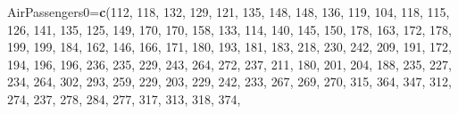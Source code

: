 \documentclass[
]{book}
\newenvironment{Shaded}{\begin{snugshade}}{\end{snugshade}}
\newcommand{\DecValTok}[1]{\textcolor[rgb]{0.00,0.00,0.81}{#1}}
\newcommand{\FunctionTok}[1]{\textcolor[rgb]{0.13,0.29,0.53}{\textbf{#1}}}
\newcommand{\NormalTok}[1]{#1}
\newcommand{\OtherTok}[1]{\textcolor[rgb]{0.56,0.35,0.01}{#1}}
\begin{document}
\begin{Shaded}
\begin{Highlighting}[]
\NormalTok{AirPassengers0}\OtherTok{=}\FunctionTok{c}\NormalTok{(}\DecValTok{112}\NormalTok{, }\DecValTok{118}\NormalTok{, }\DecValTok{132}\NormalTok{, }\DecValTok{129}\NormalTok{, }\DecValTok{121}\NormalTok{, }\DecValTok{135}\NormalTok{, }\DecValTok{148}\NormalTok{, }\DecValTok{148}\NormalTok{, }\DecValTok{136}\NormalTok{, }\DecValTok{119}\NormalTok{, }\DecValTok{104}\NormalTok{, }\DecValTok{118}\NormalTok{, }\DecValTok{115}\NormalTok{, }\DecValTok{126}\NormalTok{, }\DecValTok{141}\NormalTok{, }
                \DecValTok{135}\NormalTok{, }\DecValTok{125}\NormalTok{, }\DecValTok{149}\NormalTok{, }\DecValTok{170}\NormalTok{, }\DecValTok{170}\NormalTok{, }\DecValTok{158}\NormalTok{, }\DecValTok{133}\NormalTok{, }\DecValTok{114}\NormalTok{, }\DecValTok{140}\NormalTok{, }\DecValTok{145}\NormalTok{, }\DecValTok{150}\NormalTok{, }\DecValTok{178}\NormalTok{, }\DecValTok{163}\NormalTok{, }\DecValTok{172}\NormalTok{, }\DecValTok{178}\NormalTok{, }
                \DecValTok{199}\NormalTok{, }\DecValTok{199}\NormalTok{, }\DecValTok{184}\NormalTok{, }\DecValTok{162}\NormalTok{, }\DecValTok{146}\NormalTok{, }\DecValTok{166}\NormalTok{, }\DecValTok{171}\NormalTok{, }\DecValTok{180}\NormalTok{, }\DecValTok{193}\NormalTok{, }\DecValTok{181}\NormalTok{, }\DecValTok{183}\NormalTok{, }\DecValTok{218}\NormalTok{, }\DecValTok{230}\NormalTok{, }\DecValTok{242}\NormalTok{, }\DecValTok{209}\NormalTok{, }
                \DecValTok{191}\NormalTok{, }\DecValTok{172}\NormalTok{, }\DecValTok{194}\NormalTok{, }\DecValTok{196}\NormalTok{, }\DecValTok{196}\NormalTok{, }\DecValTok{236}\NormalTok{, }\DecValTok{235}\NormalTok{, }\DecValTok{229}\NormalTok{, }\DecValTok{243}\NormalTok{, }\DecValTok{264}\NormalTok{, }\DecValTok{272}\NormalTok{, }\DecValTok{237}\NormalTok{, }\DecValTok{211}\NormalTok{, }\DecValTok{180}\NormalTok{, }\DecValTok{201}\NormalTok{, }
                \DecValTok{204}\NormalTok{, }\DecValTok{188}\NormalTok{, }\DecValTok{235}\NormalTok{, }\DecValTok{227}\NormalTok{, }\DecValTok{234}\NormalTok{, }\DecValTok{264}\NormalTok{, }\DecValTok{302}\NormalTok{, }\DecValTok{293}\NormalTok{, }\DecValTok{259}\NormalTok{, }\DecValTok{229}\NormalTok{, }\DecValTok{203}\NormalTok{, }\DecValTok{229}\NormalTok{, }\DecValTok{242}\NormalTok{, }\DecValTok{233}\NormalTok{, }\DecValTok{267}\NormalTok{, }
                \DecValTok{269}\NormalTok{, }\DecValTok{270}\NormalTok{, }\DecValTok{315}\NormalTok{, }\DecValTok{364}\NormalTok{, }\DecValTok{347}\NormalTok{, }\DecValTok{312}\NormalTok{, }\DecValTok{274}\NormalTok{, }\DecValTok{237}\NormalTok{, }\DecValTok{278}\NormalTok{, }\DecValTok{284}\NormalTok{, }\DecValTok{277}\NormalTok{, }\DecValTok{317}\NormalTok{, }\DecValTok{313}\NormalTok{, }\DecValTok{318}\NormalTok{, }\DecValTok{374}\NormalTok{, }

\end{Highlighting}
\end{Shaded}
\end{document}
